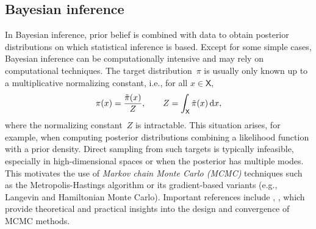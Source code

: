 \documentclass[english,graybox,envcountchap,envcountsame,sectrefs,shortlabels]{svmono}
\theoremstyle{style}
\begin{document}
\subsection{Bayesian inference}
In  Bayesian inference, prior belief  is combined with
data to obtain posterior distributions on which statistical inference is based.
Except for some simple cases, Bayesian inference can be computationally
intensive and may rely on  computational techniques. The target distribution~$\pi$ is usually only known up to a multiplicative normalizing constant, i.e., for all $x\in \mathsf{X}$,
\[
\pi(x) = \frac{\tilde{\pi}(x)}{Z}, 
\qquad Z = \int_{\mathsf{X}} \tilde{\pi}(x)\,\mathrm{d} x,
\]
where the normalizing constant~$Z$ is intractable. This situation arises, for example, when computing posterior distributions combining a likelihood function with a prior density. 
Direct sampling from such targets is typically infeasible, especially in high-dimensional spaces or when the posterior has multiple modes. 
This motivates the use of \emph{Markov chain Monte Carlo (MCMC)} techniques such as the Metropolis-Hastings algorithm or its gradient-based variants (e.g., Langevin and Hamiltonian Monte Carlo).  Important references include \cite{robert1999monte}, \cite{brooks2011handbook}, which provide theoretical and practical insights into the design and convergence of MCMC methods.
\end{document}
